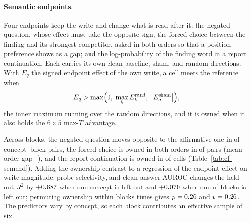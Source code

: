 \documentclass{article}
\begin{document}
\paragraph{Semantic endpoints.} Four endpoints keep the write and change what is read after it: the negated question, whose effect must take the opposite sign; the forced choice between the finding and its strongest competitor, asked in both orders so that a position preference shows as a gap; and the log-probability of the finding word in a report continuation. Each carries its own clean baseline, sham, and \cfSemLedgerRandom{} random directions. With $E_q$ the signed endpoint effect of the own write, a cell meets the reference when
\begin{equation}
E_q>\max\Bigl(0,\;\max_{k}E^{\mathrm{rand}}_{k},\;\bigl|E^{\mathrm{sham}}_q\bigr|\Bigr),
\label{eq:endpoint-reference}
\end{equation}
the inner maximum running over the \cfSemLedgerRandom{} random directions, and it is owned when it also holds the $6\times5$ max-$T$ advantage.

Across \cfSemBlocks{} blocks, the negated question moves opposite to the affirmative one in \cfSemNegOpposite{} of \cfSemNegN{} concept--block pairs, the forced choice is owned in both orders in \cfSemForcedOwned{} of \cfSemForcedN{} pairs (mean order gap \cfSemGapMin{}--\cfSemGapMax{}), and the report continuation is owned in \cfSemReportOwned{} of \cfSemReportCells{} cells (Table~\ref{tab:cf-semend}). Adding the ownership contrast to a regression of the endpoint effect on write magnitude, probe selectivity, and clean-answer AUROC changes the held-out $R^2$ by $+0.687$ when one concept is left out and $+0.070$ when one of \cfSemCvBlocks{} blocks is left out; permuting ownership within blocks \cfSemCvPerms{} times gives $p=0.26$ and $p=0.26$. The predictors vary by concept, so each block contributes an effective sample of six.
\end{document}
